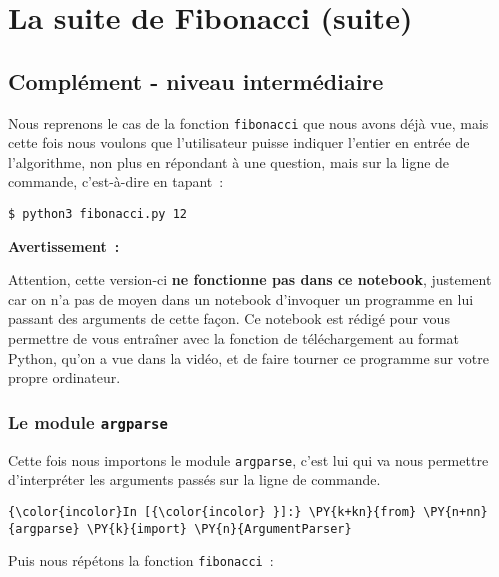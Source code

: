     \hypertarget{la-suite-de-fibonacci-suite}{%
\section{La suite de Fibonacci
(suite)}\label{la-suite-de-fibonacci-suite}}

    \hypertarget{compluxe9ment---niveau-intermuxe9diaire}{%
\subsection{Complément - niveau
intermédiaire}\label{compluxe9ment---niveau-intermuxe9diaire}}

    Nous reprenons le cas de la fonction \texttt{fibonacci} que nous avons
déjà vue, mais cette fois nous voulons que l'utilisateur puisse indiquer
l'entier en entrée de l'algorithme, non plus en répondant à une
question, mais sur la ligne de commande, c'est-à-dire en tapant~:

\begin{verbatim}
$ python3 fibonacci.py 12
\end{verbatim}

    \textbf{Avertissement~:}

Attention, cette version-ci \textbf{ne fonctionne pas dans ce notebook},
justement car on n'a pas de moyen dans un notebook d'invoquer un
programme en lui passant des arguments de cette façon. Ce notebook est
rédigé pour vous permettre de vous entraîner avec la fonction de
téléchargement au format Python, qu'on a vue dans la vidéo, et de faire
tourner ce programme sur votre propre ordinateur.

    \hypertarget{le-module-argparse}{%
\subsubsection{\texorpdfstring{Le module
\texttt{argparse}}{Le module argparse}}\label{le-module-argparse}}

    Cette fois nous importons le module \texttt{argparse}, c'est lui qui va
nous permettre d'interpréter les arguments passés sur la ligne de
commande.

    \begin{Verbatim}[commandchars=\\\{\}]
{\color{incolor}In [{\color{incolor} }]:} \PY{k+kn}{from} \PY{n+nn}{argparse} \PY{k}{import} \PY{n}{ArgumentParser}
\end{Verbatim}


    Puis nous répétons la fonction \texttt{fibonacci}~:

